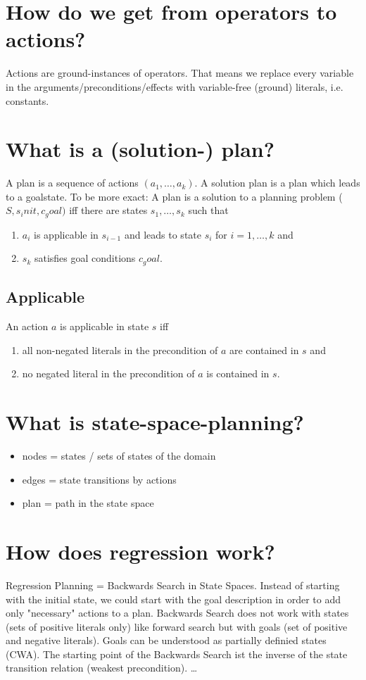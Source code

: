 \documentclass[12pt, a4paper]{article}
\begin{document}
\section{How do we get from operators to actions?}
Actions are ground-instances of operators. That means we replace every variable in the arguments/preconditions/effects with variable-free (ground) literals, i.e. constants.

\section{What is a (solution-) plan?}
A plan is a sequence of actions $(a_1, \ldots, a_k)$. A solution plan is a plan which leads to a goalstate. To be more exact: A plan is a solution to a planning problem ($S, s_init, c_goal)$ iff there are states $s_1, \ldots, s_k$ such that
\begin{enumerate}
\item $a_i$ is applicable in $s_{i-1}$ and leads to state $s_i$ for $i = 1, \ldots, k$ and 
\item $s_k$ satisfies goal conditions $c_goal$.
\end{enumerate}

\subsection*{Applicable}
An action $a$ is applicable in state $s$ iff
\begin{enumerate}
\item all non-negated literals in the precondition of $a$ are contained in $s$ and
\item no negated literal in the precondition of $a$ is contained in $s$.
\end{enumerate}

\section{What is state-space-planning?}
\begin{itemize}

\item nodes = states / sets of states of the domain
\item edges = state transitions by actions
\item plan = path in the state space
\end{itemize}

\section{How does regression work?}
Regression Planning = Backwards Search in State Spaces. Instead of starting with the initial state, we could start with the goal description in order to add only "necessary" actions to a plan. Backwards Search does not work with states (sets of positive literals only) like forward search but with goals (set of positive and negative literals). Goals can be understood as partially definied states (CWA). The starting point of the Backwards Search ist the inverse of the state transition relation (weakest precondition). \ldots
\end{document}
